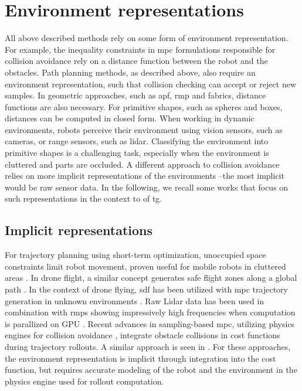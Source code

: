 \section{Environment representations}
\label{sec:environment_representations}

All above described methods rely on some form of environment
representation. For example, the inequality constraints in
\ac{mpc} formulations responsible for collision avoidance
rely on a distance function between the robot and the
obstacles. Path planning methods, as described above, 
also require an environment representation, such that
collision checking can accept or reject new samples. In
geometric approaches, such as \ac{apf}, \ac{rmp} and
\ac{fabrics}, distance functions are also necessary.
For primitive shapes, such as spheres and boxes, distances
can be computed in closed form. When working in dynamic
environments, robots perceive their environment using vision
sensors, such as cameras, or range sensors, such as lidar.
Classifying the environment into primitive shapes is a
challenging task, especially when the environment is
cluttered and parts are occluded. A different approach to
collision avoidance relies on more implicit representations
of the environments --the most implicit would be raw sensor
data. In the following, we recall some works that focus on
such representations in the context to of \ac{tg}.


\subsection{Implicit representations}
\label{sub:implicit_representations}

For trajectory planning using short-term optimization,
unoccupied space constraints limit robot movement, proven
useful for mobile robots in cluttered areas
\cite{Brito2019}. In drone flight, a similar concept
generates safe flight zones along a global path
\cite{Liu2017a,Tordesillas2019a,tordesillas2021mader}. In
the context of drone flying, \ac{sdf} has been utilized with
\ac{mpc} trajectory generation in unknown environments
\cite{Oleynikova2017voxblox}. Raw Lidar data has been used
in combination with \acp{rmp} showing impressively high
frequencies when computation is parallized on GPU
\cite{Pantic2023obstacle}. Recent advances in sampling-based
\ac{mpc}, utilizing physics engines for collision avoidance
\cite{Pezzato2023sampling}, integrate obstacle collisions in
cost functions during trajectory rollouts. A similar
approach is seen in \cite{Sundaralingam2023curobo}. For
these approaches, the environment representation is implicit
through integration into the cost function, but requires
accurate modeling of the robot and the environment in the
physics engine used for rollout computation.


